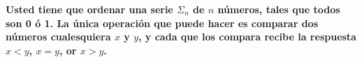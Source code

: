 \textbf{Usted tiene que ordenar una serie $\Sigma_n$ de $n$ números, tales que todos son 0 ó 1. La única operación que puede hacer es comparar dos números cualesquiera $x$ y $y$, y cada que los compara recibe la respuesta $x < y$, $x = y$, or $x > y$.}\vspace{.2cm}

\textcolor{bibi}{}
\begin{quote}
\end{quote}